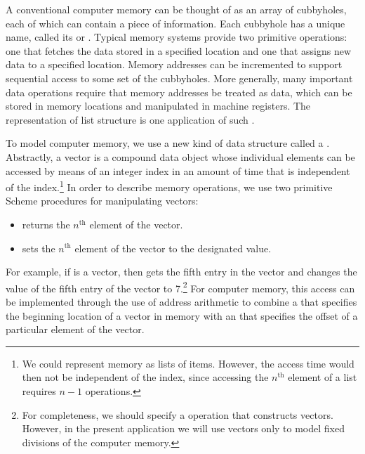 A conventional computer memory can be thought of as an array of cubbyholes,
each of which can contain a piece of information.  Each cubbyhole has a unique
name, called its  or .  Typical memory
systems provide two primitive operations: one that fetches the data stored in a
specified location and one that assigns new data to a specified location.
Memory addresses can be incremented to support sequential access to some set of
the cubbyholes.  More generally, many important data operations require that
memory addresses be treated as data, which can be stored in memory locations
and manipulated in machine registers.  The representation of list structure is
one application of such .

To model computer memory, we use a new kind of data structure called a
.  Abstractly, a vector is a compound data object whose
individual elements can be accessed by means of an integer index in an amount
of time that is independent of the index.\footnote{We could represent memory as
lists of items.  However, the access time would then not be independent of the
index, since accessing the \( n^{\mathrm{th}} \) element of a list requires \( n - 1 \)
 operations.} In order to describe memory operations, we use two
primitive Scheme procedures for manipulating vectors:

\begin{itemize}

\item
{} returns the \( n^{\mathrm{th}} \)
element of the vector.

\item
{}
sets the \( n^{\mathrm{th}} \) element of the vector to the designated value.

\end{itemize}

\noindent
For example, if  is a vector, then  gets the
fifth entry in the vector  and  changes the
value of the fifth entry of the vector  to 7.\footnote{For
completeness, we should specify a  operation that constructs
vectors.  However, in the present application we will use vectors only to model
fixed divisions of the computer memory.}  For computer memory, this access can
be implemented through the use of address arithmetic to combine a  that specifies the beginning location of a vector in memory with an
 that specifies the offset of a particular element of the
vector.

